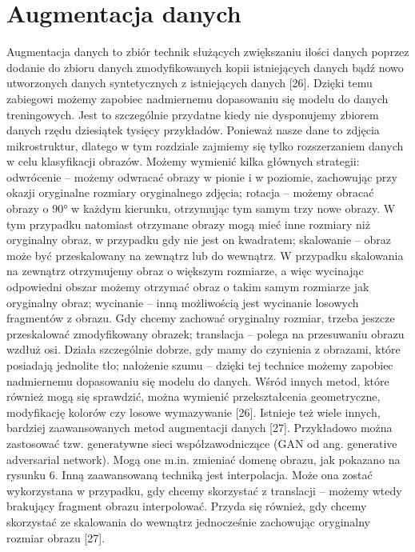 \section{Augmentacja danych}
\label{cha:cha3.4}

Augmentacja danych to zbiór technik służących zwiększaniu ilości danych poprzez dodanie do zbioru danych zmodyfikowanych kopii istniejących danych bądź nowo utworzonych danych syntetycznych z istniejących danych [26]. Dzięki temu zabiegowi możemy zapobiec nadmiernemu dopasowaniu się modelu do danych treningowych. Jest to szczególnie przydatne kiedy nie dysponujemy zbiorem danych rzędu dziesiątek tysięcy przykładów. Ponieważ nasze dane to zdjęcia mikrostruktur, dlatego w tym rozdziale zajmiemy się tylko rozszerzaniem danych w celu klasyfikacji obrazów. Możemy wymienić kilka głównych strategii:
odwrócenie – możemy odwracać obrazy w pionie i w poziomie, zachowując przy okazji oryginalne rozmiary oryginalnego zdjęcia;
rotacja – możemy obracać obrazy o 90° w każdym kierunku, otrzymując tym samym trzy nowe obrazy. W tym przypadku natomiast otrzymane obrazy mogą mieć inne rozmiary niż oryginalny obraz, w przypadku gdy nie jest on kwadratem;
skalowanie – obraz może być przeskalowany na zewnątrz lub do wewnątrz. W przypadku skalowania na zewnątrz otrzymujemy obraz o większym rozmiarze, a więc wycinając odpowiedni obszar możemy otrzymać obraz o takim samym rozmiarze jak oryginalny obraz;
wycinanie – inną możliwością jest wycinanie losowych fragmentów z obrazu. Gdy chcemy zachować oryginalny rozmiar, trzeba jeszcze przeskalować zmodyfikowany obrazek;
translacja – polega na przesuwaniu obrazu wzdłuż osi. Działa szczególnie dobrze, gdy mamy do czynienia z obrazami, które posiadają jednolite tło;
nałożenie szumu – dzięki tej technice możemy zapobiec nadmiernemu dopasowaniu się modelu do danych. 
Wśród innych metod, które również mogą się sprawdzić, można wymienić przekształcenia geometryczne, modyfikację kolorów czy losowe wymazywanie [26]. Istnieje też wiele innych, bardziej zaawansowanych metod augmentacji danych [27]. Przykładowo można zastosować tzw. generatywne sieci współzawodniczące (GAN od ang. generative adversarial network). Mogą one m.in. zmieniać domenę obrazu, jak pokazano na rysunku 6. Inną zaawansowaną techniką jest interpolacja. Może ona zostać wykorzystana w przypadku, gdy chcemy skorzystać z translacji – możemy wtedy brakujący fragment obrazu interpolować. Przyda się również, gdy chcemy skorzystać ze skalowania do wewnątrz jednocześnie zachowując oryginalny rozmiar obrazu [27]. 

